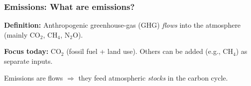 \documentclass[xcolor=x11names,compress,aspectratio=169]{beamer}%
\makeatletter
\renewenvironment{itemize}{\begin{compactitemize}[<+-| alert@+>]}{\end{compactitemize}}
\makeatother
\begin{document}
\begin{frame}%
%

\frametitle{Emissions: What are emissions?}%


\begin{itemize}
\item \textbf{Definition:} Anthropogenic greenhouse-gas (GHG) \emph{flows}
into the atmosphere (mainly CO$_{2}$, CH$_{4}$, N$_{2}$O).

\item \textbf{Focus today:} CO$_{2}$ (fossil fuel + land use). Others can be
added (e.g., CH$_{4}$) as separate inputs.

\item Emissions are flows $\Rightarrow$ they feed atmospheric \emph{stocks} in
the carbon cycle.
\end{itemize}

%

\transboxout
\end{frame}%
%
\end{document}
